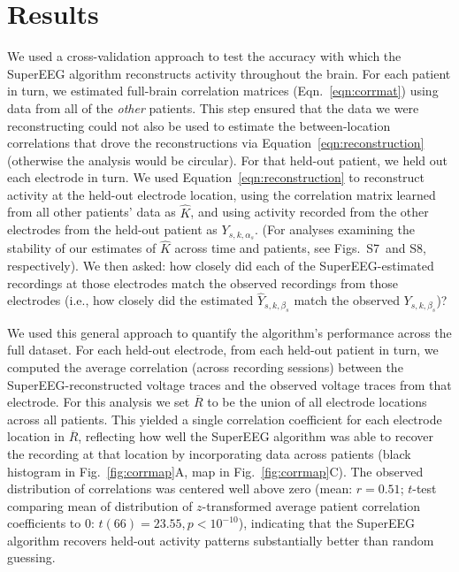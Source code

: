 \documentclass[11pt]{article}
\newcommand{\temporalstability}{S7}
\newcommand{\patientstability}{S8}
\begin{document}
\section*{Results}
We used a cross-validation approach to test the accuracy with which
the SuperEEG algorithm reconstructs activity throughout the brain. For
each patient in turn, we estimated full-brain correlation matrices
(Eqn.~\ref{eqn:corrmat}) using data from all of the \textit{other}
patients.  This step ensured that the data we were reconstructing
could not also be used to estimate the between-location correlations
that drove the reconstructions via Equation~\ref{eqn:reconstruction}
(otherwise the analysis would be circular).  For that held-out
patient, we held out each electrode in turn.  We used
Equation~\ref{eqn:reconstruction} to reconstruct activity at the
held-out electrode location, using the correlation matrix learned from
all other patients' data as $\hat{K}$, and using activity recorded
from the other electrodes from the held-out patient as
$Y_{s, k, \alpha_s}$.  (For analyses examining the stability of our
estimates of $\hat{K}$ across time and patients, see
Figs.~\temporalstability~and \patientstability, respectively).  We then asked: how closely did each of the
SuperEEG-estimated recordings at those electrodes match the observed
recordings from those electrodes (i.e., how closely did the estimated
$\hat{Y}_{s, k, \beta_s}$ match the observed $Y_{s, k, \beta_s}$)?

We used this general approach to quantify the algorithm's performance across the
full dataset. For each held-out electrode, from each held-out patient in turn,
we computed the average correlation (across recording sessions) between the
SuperEEG-reconstructed voltage traces and the observed voltage traces from that
electrode.  For this analysis we set $\overline{R}$ to be the union of all electrode
locations across all patients.  This yielded a single correlation coefficient
for each electrode location in $\overline{R}$, reflecting how well the SuperEEG
algorithm was able to recover the recording at that location by incorporating
data across patients (black histogram in Fig.~\ref{fig:corrmap}A, map in
Fig.~\ref{fig:corrmap}C).  The observed distribution of correlations was
centered well above zero (mean: $r = 0.51$; $t$-test comparing mean of distribution of
$z$-transformed average patient correlation coefficients to 0: $t(66) = 23.55, p
< 10^{-10}$), indicating that the SuperEEG algorithm recovers held-out activity
patterns substantially better than random guessing.
\end{document}
